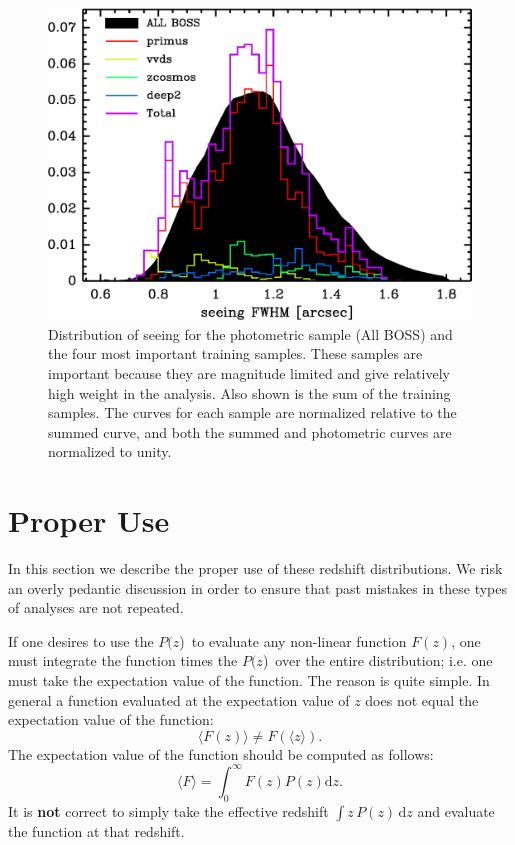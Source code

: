 \documentclass[12pt,preprint]{aastex}
\newcommand{\pofz}{$P(z$)}
\begin{document}
\begin{figure}[h]\centering
    \includegraphics[scale=0.7]{figures/primus-vvds-zcosmos-deep2-match-seeing-10.eps}

    \caption{Distribution of seeing for the photometric sample (All BOSS) and
    the four most important training samples.  These samples are important
    because they are magnitude limited and give relatively high weight in the
    analysis.  Also shown is the sum of the training samples.  The curves for
    each sample are normalized relative to the summed curve,  and both the
    summed and photometric curves are normalized to unity.}

    \label{fig:seeing}
\end{figure}



\section{Proper Use} \label{sec:usage}

In this section we describe the proper use of these redshift distributions.
We risk an overly pedantic discussion in order to ensure that past
mistakes in these types of analyses are not repeated.

If one desires to use the \pofz\ to evaluate any non-linear function $F(z)$,
one must integrate the function times the \pofz\ over the entire distribution;
i.e. one must take the expectation value of the function.  The reason is quite
simple. In general a function evaluated at the expectation value of $z$ does not
equal the expectation value of the function:
\begin{equation}
\langle F(z) \rangle \ne F(\langle z \rangle).
\end{equation}
The expectation value of the function should be computed as follows:
\begin{equation}
\langle F \rangle = \int_{0}^{\infty} F(z) P(z) \mathrm{d}z.
\end{equation}
It is {\bf not} correct to simply take the effective redshift $\int
z\,P(z)\,\mathrm{d}z$ and evaluate
the function at that redshift.
\end{document}
